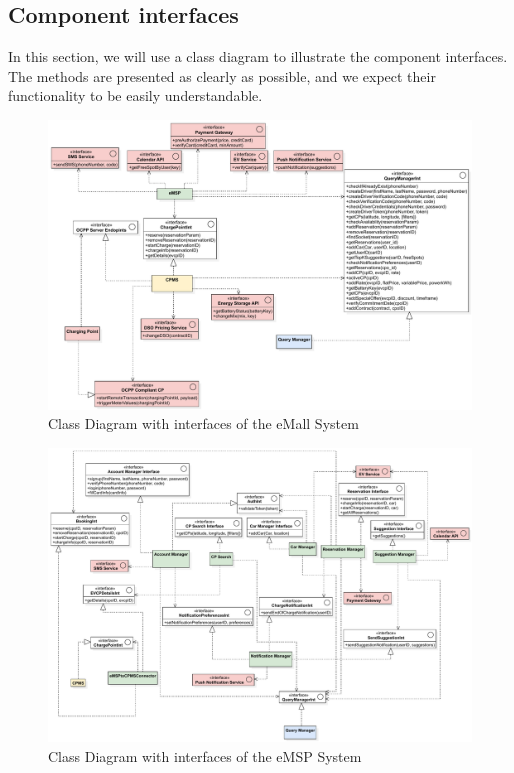 \subsection{Component interfaces}
In this section, we will use a class diagram to illustrate the component interfaces. The methods are presented as clearly as possible, and we expect their functionality to be easily understandable.
\begin{figure}[H]
    \centering
    \hspace*{-2.5cm}
    \includegraphics[scale=0.6]{src/componentInterfaces/overview_interface.pdf}
    \caption{Class Diagram with interfaces of the eMall System}
\end{figure}
\begin{figure}[hp]
    \centering
    \hspace*{-2.5cm}
    \includegraphics[scale=0.55]{src/componentInterfaces/emsp_interface.pdf}
    \caption{Class Diagram with interfaces of the eMSP System}
\end{figure}
